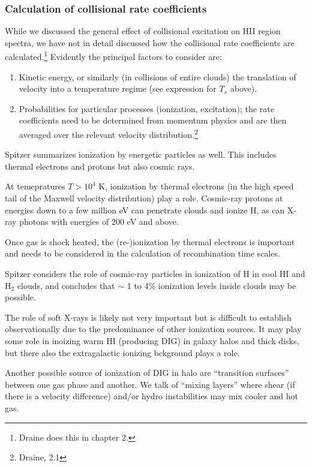 \documentclass[11pt]{article}
\newcommand{\mar}[1]{\hspace{0pt}\marginpar{-\textcolor{black}{#1}-}}
\begin{document}
\subsubsection{Calculation of collisional rate coefficients}
While we discussed the general effect of collisional excitation on HII
region spectra, we have not in detail discussed how the collisional rate
coefficients are calculated.\footnote{Draine does this in chapter 2.}
Evidently the principal factors to consider are:
\begin{enumerate}
    \item Kinetic energy, or similarly (in collisions of entire clouds) the
        translation of velocity into a temperature regime (see expression
        for $T_{s}$ above).
    \item Probabilities for particular processes (ionization, excitation);
        the rate coefficients need to be determined from momentum physics
        and are then averaged over the relevant velocity
        distribution.\footnote{Draine, 2.1}
\end{enumerate}
Spitzer summarizes ionization by energetic particles as well. This includes
thermal electrons and protons but also cosmic rays.

\mar{144}At temepratures $T > 10^{4}$ K, ionization by thermal electrons
(in the high speed tail of the Maxwell velocity distribution) play a role.
Cosmic-ray protons at energies down to a few million eV can penetrate
clouds and ionize H, as can X-ray photons with energies of 200 eV and above.

Once gas is shock heated, the (re-)ionization by thermal electrons is
important and needs to be considered in the calculation of recombination
time scales.

Spitzer considers the role of cosmic-ray particles in ionization of H
in cool HI and H$_{2}$ clouds, and concludes that $\sim$ 1 to 4\% ionization
levels inside clouds may be possible.

The role of soft X-rays is likely not very important but is difficult to
establish observationally due to the predominance of other ionization sources.
It may play some role in inoizing warm HI (producing DIG) in galaxy halos
and thick disks, but there also the extragalactic ionizing bckground plays
a role.

Another possible source of ionization of DIG in halo are ``transition
surfaces'' between one gas phase and another. We talk of ``mixing layers''
where shear (if there is a velocity difference) and/or hydro instabilities may
mix cooler and hot gas.
\end{document}

